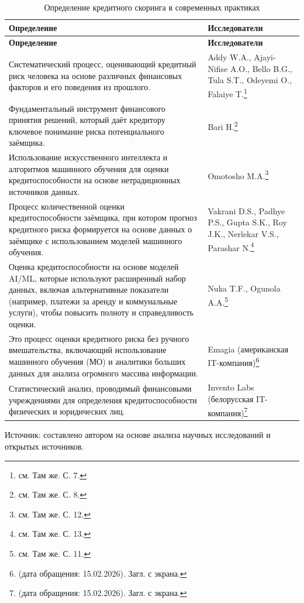 \newpage
\begin{center}
\begin{longtable}{|p{}|p{}|}
	\caption{Определение кредитного скоринга в современных практиках}
	\label{tab:credit_scoring_definitions} \\
	\hline
	\textbf{Определение} & \textbf{Исследователи} \\ \hline
	\endfirsthead
	
	\hline
	\textbf{Определение} & \textbf{Исследователи} \\ \hline
	\endhead
	
	Систематический процесс, оценивающий кредитный риск человека на основе различных финансовых факторов и его поведения из прошлого. 
	& Addy W.A., Ajayi-Nifise A.O., Bello B.G., Tula S.T., Odeyemi O., Falaiye T.\footnote{см. Там же. С. 7.} \\ \hline
	
	Фундаментальный инструмент финансового принятия решений, который даёт кредитору ключевое понимание риска потенциального заёмщика. 
	& Bari H.\footnote{см. Там же. С. 8.} \\ \hline
	
	Использование искусственного интеллекта и алгоритмов машинного обучения для оценки кредитоспособности на основе нетрадиционных источников данных. 
	& Omotosho M.A.\footnote{см. Там же. С. 12.} \\ \hline
	
	Процесс количественной оценки кредитоспособности заёмщика, при котором прогноз кредитного риска формируется на основе данных о заёмщике с использованием моделей машинного обучения. 
	& Vakrani D.S., Padhye P.S., Gupta S.K., Roy J.K., Nerlekar V.S., Parashar N.\footnote{см. Там же. С. 13.} \\ \hline
	
	Оценка кредитоспособности на основе моделей AI/ML, которые используют расширенный набор данных, включая альтернативные показатели (например, платежи за аренду и коммунальные услуги), чтобы повысить полноту и справедливость оценки. 
	& Nuka T.F., Ogunola A.A.\footnote{см. Там же. С. 11.} \\ \hline
	
	Это процесс оценки кредитного риска без ручного вмешательства, включающий использование машинного обучения (МО) и аналитики больших данных для анализа огромного массива информации. 
	& Emagia (американская IT-компания)\footnote{\cite{Emagia} (дата обращения: 15.02.2026). Загл. с экрана.} \\ \hline
	
	Статистический анализ, проводимый финансовыми учреждениями для определения кредитоспособности физических и юридических лиц. 
	& Invento Labs (белорусская IT-компания)\footnote{\cite{InventoLabs} (дата обращения: 15.02.2026). Загл. с экрана.} \\ \hline
\end{longtable}
 \begin{minipage}{\textwidth}
	\fontsize{9}{11}\selectfont
	\justifying
	Источник: составлено автором на основе анализа научных исследований и открытых источников.
\end{minipage}
\end{center}

